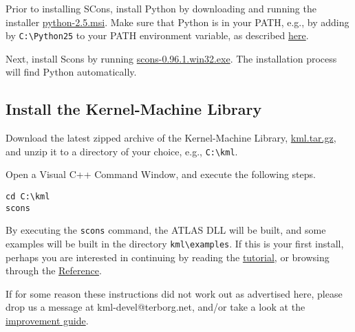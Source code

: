 \documentclass{article}
\begin{document}
Prior to installing SCons, install Python
by downloading and running the installer \href{http://www.python.org/ftp/python/2.5/python-2.5.msi}{python-2.5.msi}.
Make sure that Python is in your PATH, e.g., by adding by \texttt{C:\textbackslash Python25} 
to your PATH environment variable, as
described \href{http://www.python.org/doc/faq/windows.html#how-do-i-run-a-python-program-under-windows}{here}.

Next, install Scons by running 
\href{http://prdownloads.sourceforge.net/scons/scons-0.96.1.win32.exe?download}{scons-0.96.1.win32.exe}. 
The installation process will find
Python automatically.

\subsection{Install the Kernel-Machine Library}
Download the latest zipped archive of the Kernel-Machine Library, 
\href{http://www.terborg.net/cgi-bin/viewcvs.cgi/trunk/kml.tar.gz?view=tar}{kml.tar.gz}, 
and unzip it to a directory of your choice, e.g., \texttt{C:\textbackslash kml}.

Open a Visual C++ Command Window, and execute the following steps.
%
\begin{verbatim}
cd C:\kml
scons
\end{verbatim}
%
By executing the \texttt{scons} command, the ATLAS DLL will be built, 
and some examples will be built in the directory \texttt{kml\textbackslash examples}.
If this is your first install, perhaps you are interested in continuing 
by reading the \href{\kmlroot/tutorial.html}{tutorial}, or browsing through 
the \href{\kmlroot/reference/}{Reference}.

If for some reason these instructions did not work out as advertised here,
please drop us a message at kml-devel@terborg.net, and/or take a look
at the \href{\kmlroot/improvement.html}{improvement guide}.



\end{document}
